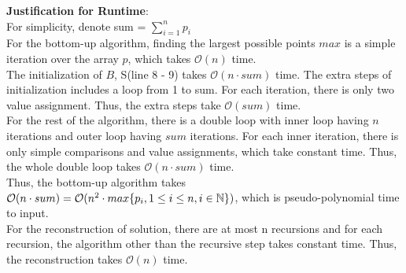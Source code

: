 \documentclass[11pt]{article}
\begin{document}
\begin{enumerate}
\begin{enumerate}
    \end{enumerate}
    
    \textbf{Justification for Runtime}:\\
    For simplicity, denote sum = $\sum_{i=1}^n p_i$\\[2ex]
    For the bottom-up algorithm, finding the largest possible points $max$ is a simple iteration over the array $p$, which takes $\mathcal{O}(n)$ time.\\
    The initialization of $B$, S(line 8 - 9) takes $\mathcal{O}(n\cdot sum)$ time. The extra steps of initialization includes a loop from 1 to sum. For each iteration, there is only two value assignment. Thus, the extra steps take $\mathcal{O}(sum)$ time.\\
    For the rest of the algorithm, there is a double loop with inner loop having $n$ iterations and outer loop having $sum$ iterations. For each inner iteration, there is only simple comparisons and value assignments, which take constant time. Thus, the whole double loop takes $\mathcal{O}(n\cdot sum)$ time.\\
    Thus, the bottom-up algorithm takes $\mathcal{O}(n\cdot sum) = \mathcal{O}(n^2 \cdot max\{p_i, 1\leq i \leq n, i\in \mathbb N\})$, which is pseudo-polynomial time to input.\\
    
    For the reconstruction of solution, there are at most n recursions and for each recursion, the algorithm other than the recursive step takes constant time. Thus, the reconstruction takes $\mathcal{O}(n)$ time.
    
    
\end{enumerate}
\end{document}
